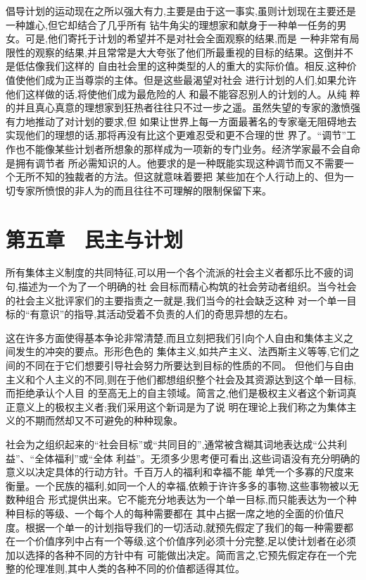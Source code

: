 ﻿\documentclass[12pt]{article}
\begin{document}
倡导计划的运动现在之所以强大有力,主要是由于这一事实,虽则计划现在主要还是一种雄心,但它却结合了几乎所有
钻牛角尖的理想家和献身于一种单一任务的男女。可是,他们寄托于计划的希望并不是对社会全面观察的结果,而是
一种非常有局限性的观察的结果,并且常常是大大夸张了他们所最重视的目标的结果。这倒并不是低估像我们这样的
自由社会里的这种类型的人的重大的实际价值。相反,这种价值使他们成为正当尊崇的主体。但是这些最渴望对社会
进行计划的人们,如果允许他们这样做的话,将使他们成为最危险的人 \myrule 和最不能容忍别人的计划的人。从纯
粹的并且真心真意的理想家到狂热者往往只不过一步之遥。虽然失望的专家的激愤强有力地推动了对计划的要求,但
如果让世界上每一方面最著名的专家毫无阻碍地去实现他们的理想的话,那将再没有比这个更难忍受和更不合理的世
界了。``调节''工作也不能像某些计划者所想象的那样成为一项新的专门业务。经济学家最不会自命是拥有调节者
所必需知识的人。他要求的是一种既能实现这种调节而又不需要一个无所不知的独裁者的方法。但这就意味着要把
某些加在个人行动上的、但为一切专家所愤恨的非人为的而且往往不可理解的限制保留下来。



\section{第五章　民主与计划}


所有集体主义制度的共同特征,可以用一个各个流派的社会主义者都乐比不疲的词句,描述为一个为了一个明确的社
会目标而精心构筑的社会劳动者组织。当今社会的社会主义批评家们的主要指责之一就是,我们当今的社会缺乏这种
对一个单一目标的``有意识''的指导,其活动受着不负责的人们的奇思异想的左右。

这在许多方面使得基本争论非常清楚,而且立刻把我们引向个人自由和集体主义之间发生的冲突的要点。形形色色的
集体主义,如共产主义、法西斯主义等等,它们之间的不同在于它们想要引导社会努力所要达到目标的性质的不同。
但他们与自由主义和个人主义的不同,则在于他们都想组织整个社会及其资源达到这个单一目标,而拒绝承认个人目
的至高无上的自主领域。简言之,他们是极权主义者这个新词真正意义上的极权主义者;我们采用这个新词是为了说
明在理论上我们称之为集体主义的不期而然却又不可避免的种种现象。

社会为之组织起来的``社会目标''或``共同目的'',通常被含糊其词地表达成``公共利益''、``全体福利''或``全体
利益''。无须多少思考便可看出,这些词语没有充分明确的意义以决定具体的行动方针。千百万人的福利和幸福不能
单凭一个多寡的尺度来衡量。一个民族的福利,如同一个人的幸福,依赖于许许多多的事物,这些事物被以无数种组合
形式提供出来。它不能充分地表达为一个单一目标,而只能表达为一个种种目标的等级、一个每个人的每种需要都在
其中占据一席之地的全面的价值尺度。根据一个单一的计划指导我们的一切活动,就预先假定了我们的每一种需要都
在一个价值序列中占有一个等级,这个价值序列必须十分完整,足以使计划者在必须加以选择的各种不同的方针中有
可能做出决定。简而言之,它预先假定存在一个完整的伦理准则,其中人类的各种不同的价值都适得其位。
\end{document}
